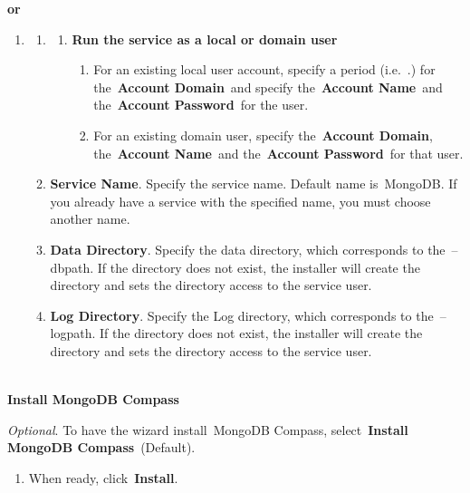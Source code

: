 \documentclass{article}
\begin{document}
\textbf{or}

\begin{enumerate}
\item \begin{enumerate}
\item \begin{enumerate}
\item  \textbf{Run the service as a local or domain user}

\begin{enumerate}
\item  For an existing local user account, specify a period (i.e.~.) for the~\textbf{Account Domain}~and specify the~\textbf{Account Name}~and the~\textbf{Account Password}~for the user.

\item  For an existing domain user, specify the~\textbf{Account Domain}, the~\textbf{Account Name}~and the~\textbf{Account Password}~for that user.
\end{enumerate}
\end{enumerate}

\item  \textbf{Service Name}. Specify the service name. Default name is~MongoDB. If you already have a service with the specified name, you must choose another name.

\item  \textbf{Data Directory}. Specify the data directory, which corresponds to the~--dbpath. If the directory does not exist, the installer will create the directory and sets the directory access to the service user.

\item  \textbf{Log Directory}. Specify the Log directory, which corresponds to the~--logpath. If the directory does not exist, the installer will create the directory and sets the directory access to the service user.
\end{enumerate}
\end{enumerate}

\noindent \textbf{}

\noindent \\ \textbf{Install MongoDB Compass}

\noindent \textit{Optional}. To have the wizard install~MongoDB Compass, select~\textbf{Install MongoDB Compass}~(Default).

\begin{enumerate}
\item  When ready, click~\textbf{Install}.
\end{enumerate}
\end{document}
